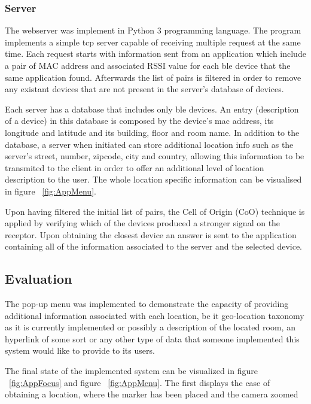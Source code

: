 \documentclass[a4paper]{IEEEtran}
\begin{document}
\subsubsection{ Server}
\label{subsec:server}

The webserver was implement in Python 3 programming language. The program implements a simple tcp server capable of receiving multiple request at the same time. Each request starts with information sent from an application which include a pair of MAC address and associated RSSI value for each ble device that the same application found. Afterwards the list of pairs is filtered in order to remove any existant devices that are not present in the server's database of devices.

Each server has a database that includes only ble devices. An entry (description of a device) in this database is composed by the device's mac address, its longitude and latitude and its building, floor and room name. In addition to the database, a server when initiated can store additional location info such as the server's street, number, zipcode, city and country, allowing this information to be transmited to the client in order to offer an additional level of location description to the user. The whole location specific information can be visualised in figure ~\ref{fig:AppMenu}.

Upon having filtered the initial list of pairs, the Cell of Origin (CoO) technique is applied by verifying which of the devices produced a stronger signal on the receptor. Upon obtaining the closest device an answer is sent to the application containing all of the information associated to the server and the selected device.

\subsection{Evaluation}
\label{sec:eval}


The pop-up menu was implemented to demonstrate the capacity of providing additional information associated with each location, be it geo-location taxonomy as it is currently implemented or possibly a description of the located room, an hyperlink of some sort or any other type of data that someone implemented this system would like to provide to its users.  

The final state of the implemented system can be visualized in figure ~\ref{fig:AppFocus} and figure ~\ref{fig:AppMenu}. The first displays the case of obtaining a location, where the marker has been placed and the camera zoomed
\end{document}
